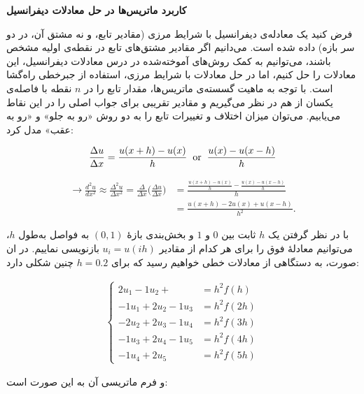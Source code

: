 \textbf{کاربرد ماتریس‌ها در حل معادلات دیفرانسیل}

فرض کنید یک معادله‌ی دیفرانسیل با شرایط مرزی (مقادیر تابع، و نه مشتق آن، در دو سر بازه) داده شده است. می‌دانیم اگر مقادیر مشتق‌های تابع در نقطه‌ی اولیه مشخص باشند، می‌توانیم به کمک روش‌های آموخته‌شده در درس معادلات دیفرانسیل، این معادلات را حل کنیم، اما در حل معادلات با شرایط مرزی، استفاده از جبرخطی راه‌گشا است. با توجه به ماهیت گسسته‌ی ماتریس‌ها، مقدار تابع را در $n$ نقطه با فاصله‌ی یکسان از هم در نظر می‌گیریم و مقادیر تقریبی برای جواب اصلی را در این نقاط می‌یابیم. می‌توان میزان اختلاف و تغییرات تابع را به دو روش «رو به جلو» و «رو به عقب» مدل کرد:

$$\frac{\Delta u}{\Delta x}=\frac{u(x+h)-u(x)}{h} \hspace*{.2cm} \text{or} \hspace*{.2cm} \frac{u(x)-u(x-h)}{h} $$

\begin{align*}
\to \frac{d^2u}{dx^2}\approx  \frac{\Delta^2 u}{\Delta x^2} = \frac{\Delta }{\Delta x}\Big(\frac{\Delta u}{\Delta x}\Big)&=
\frac{\frac{u(x+h)-u(x)}{h}-\frac{u(x)-u(x-h)}{h}}{h}\\&
=	\frac{u(x+h)-2u(x)+u(x-h)}{h^2}.
\end{align*}

با در نظر گرفتن یک $h$ ثابت بین $0$ و $1$ و بخش‌بندی بازهٔ $(0,1)$ به فواصل به‌طول $h$، می‌توانیم معادلهٔ فوق را برای هر کدام از مقادیر $u_i=u(ih)$ بازنویسی نماییم. در ان صورت، به دستگاهی از معادلات خطی خواهیم رسید که برای $h=0.2$ چنین شکلی دارد:

\begin{align*}
\left\{\begin{aligned}
2 u_{1}-1 u_{2}+&=h^{2} f(h) \\
-1 u_{1}+2 u_{2}-1 u_{3} &=h^{2} f(2 h) \\
-2 u_{2}+2 u_{3}-1 u_{4} &=h^{2} f(3 h) \\
-1 u_{3}+2 u_{4}-1 u_{5} &=h^{2} f(4 h) \\
-1 u_{4}+2 u_{5} &=h^{2} f(5 h)
\end{aligned}\right.
\end{align*}

و فرم ماتریسی آن به این صورت است:

